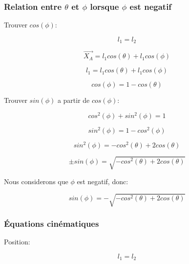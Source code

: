 \documentclass{article}
\begin{document}
\subsubsection{Relation entre $\theta$ et $\phi$ lorsque $\phi$ est negatif}
Trouver $cos(\phi)$:

\begin{equation}
l_1 = l_2
\end{equation}

\begin{equation}
\overrightarrow{X_A} = l_1cos(\theta)+l_1cos(\phi)
\end{equation}

\begin{equation}
l_1 = l_1cos(\theta)+l_1cos(\phi)
\end{equation}

\begin{equation}
cos(\phi) = 1-cos(\theta)
\end{equation}

\noindent Trouver $sin(\phi)$ a partir de $cos(\phi)$:

\begin{equation}
cos^2(\phi)+sin^2(\phi) = 1
\end{equation}

\begin{equation}
sin^2(\phi) = 1-cos^2(\phi)
\end{equation}

\begin{equation}
sin^2(\phi) = -cos^2(\theta)+2cos(\theta)
\end{equation}

\begin{equation}
\pm sin(\phi) = \sqrt{-cos^2(\theta)+2cos(\theta)}
\end{equation}

\noindent Nous considerons que $\phi$ est negatif, donc:

\begin{equation}
sin(\phi) = -\sqrt{-cos^2(\theta)+2cos(\theta)}
\end{equation}

\subsubsection{Équations cinématiques}
Position:

\begin{equation}
l_1 = l_2
\end{equation}
\end{document}
